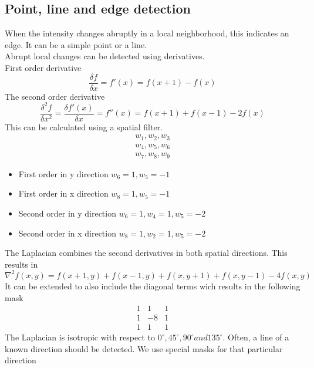 \subsection{Point, line and edge detection}
When the intensity changes abruptly in a local neighborhood, this indicates an edge. It can be a simple point or a line.\\
Abrupt local changes can be detected using derivatives.\\
First order derivative
\[
	\frac{\delta f}{\delta x} = f'(x)=f(x+1)-f(x)
\]
The second order derivative
\[
	\frac{\delta^2f}{\delta x^2}=\frac{\delta f'(x)}{\delta x}=f''(x)=f(x+1)+f(x-1)-2f(x)
\]
This can be calculated using a spatial filter.
\[
	\begin{matrix}
	w_1, w_2, w_3\\
	w_4, w_5, w_6\\
	w_7, w_8, w_9
	\end{matrix}
\]
\begin{itemize}
\item First order in y direction $w_6=1, w_5=-1$
\item First order in x direction $w_8=1, w_5=-1$
\item Second order in y direction $w_6=1, w_4=1, w_5=-2$
\item Second order in x direction $w_8=1, w_2=1, w_5=-2$
\end{itemize}
The Laplacian combines the second derivatives in both spatial directions. This results in
\[
	\nabla^2f(x,y)=f(x+1,y)+f(x-1,y)+f(x,y+1)+f(x,y-1)-4f(x,y)
\]
It can be extended to also include the diagonal terms wich results in the following mask
\[
	\begin{matrix}
	 1 & 1 & 1\\
	 1 & -8 & 1\\
	 1 & 1 & 1
	\end{matrix}
\]
The Laplacian is isotropic with respect to $0^\circ, 45^\circ, 90^\circ and 135^\circ$. 
Often, a line of a known direction should be detected. We use special masks for that particular direction
